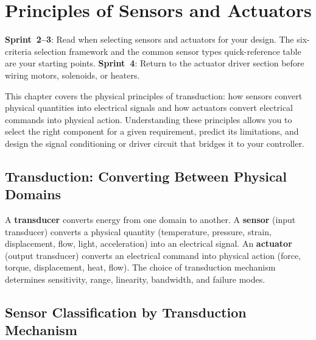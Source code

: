 \chapter{Principles of Sensors and Actuators}\label{ch:sensors}

\begin{tipbox}
\textbf{Sprint~2--3}: Read when selecting sensors and actuators for your design. The six-criteria selection framework and the common sensor types quick-reference table are your starting points. \textbf{Sprint~4}: Return to the actuator driver section before wiring motors, solenoids, or heaters.
\end{tipbox}


\vspace{1em}

This chapter covers the physical principles of transduction: how sensors convert physical quantities into electrical signals and how actuators convert electrical commands into physical action. Understanding these principles allows you to select the right component for a given requirement, predict its limitations, and design the signal conditioning or driver circuit that bridges it to your controller.

\vspace{1em}

\section{Transduction: Converting Between Physical Domains}
A \textbf{transducer} converts energy from one domain to another. A \textbf{sensor} (input transducer) converts a physical quantity (temperature, pressure, strain, displacement, flow, light, acceleration) into an electrical signal. An \textbf{actuator} (output transducer) converts an electrical command into physical action (force, torque, displacement, heat, flow). The choice of transduction mechanism determines sensitivity, range, linearity, bandwidth, and failure modes.

\section{Sensor Classification by Transduction Mechanism}

